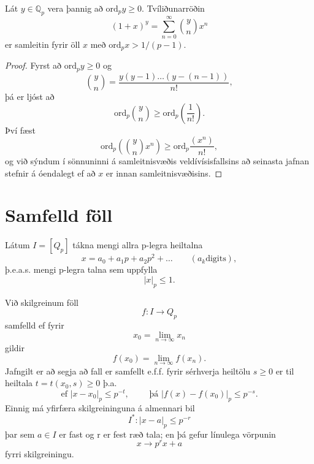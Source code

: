 \begin{setn}
Lát $y\in \mathbb{Q}_p$ vera þannig að $\mbox{ord}_p y \geq 0$. Tvíliðunarröðin 
\begin{equation*}
(1+x)^y = \sum_{n=0}^\infty \binom{y}{n}x^n
\end{equation*}
er samleitin fyrir öll $x$ með $\mbox{ord}_px>1/(p-1)$.
\end{setn}
\begin{proof}
Fyrst að $\mbox{ord}_py\geq0$ og 
\begin{equation*}
\binom{y}{n} = \frac{y(y-1)\ldots (y-(n-1))}{n!},
\end{equation*}
þá er ljóst að
\begin{equation*}
\mbox{ord}_p \binom{y}{n} \geq \mbox{ord}_p \left( \frac{1}{n!} \right).
\end{equation*}
Því fæst
\begin{equation*}
\mbox{ord}_p \left( \binom{y}{n} x^n \right) \geq \mbox{ord}_p \frac{(x^n) }{n!},
\end{equation*}
og við sýndum í sönnuninni á samleitnisvæðis veldívísisfallsins að seinasta jafnan stefnir á óendalegt ef að $x$ er innan samleitnisvæðisins.
\end{proof}


\section*{Samfelld föll}
Látum $I=[Q_p]$ tákna mengi allra p-legra heiltalna
\begin{equation*}
x = a_0 + a_1p+a_2p^2 + \ldots \qquad (a_k \mbox{digits}), 
\end{equation*} 
þ.e.a.s. mengi p-legra talna sem uppfylla
\begin{equation*}
 |x|_p \leq 1 .
\end{equation*}
\begin{skilgr}
Við skilgreinum föll
\begin{equation*}
f:I \rightarrow Q_p
\end{equation*}
samfelld ef fyrir 
\begin{equation*}
x_0 = \lim_{n \rightarrow \infty} x_n
\end{equation*}
gildir
\begin{equation*}
f(x_0) = \lim_{n \rightarrow \infty} f(x_n).
\end{equation*}
Jafngilt er að segja að fall er samfellt e.f.f. fyrir sérhverja heiltölu $s\geq 0$ er til heiltala $t = t(x_0,s)\geq 0$ þ.a.
\begin{equation*}
\mbox{ef } |x-x_0|_p \leq p^{-t},\qquad \mbox{  þá } |f(x)-f(x_0)|_p \leq p^{-s}.
\end{equation*}
Einnig má yfirfæra skilgreininguna á almennari bil
\begin{equation*}
I^* : |x-a|_p \leq p^{-r}
\end{equation*} 
þar sem $a \in I$ er fast og r er fest ræð tala; en þá gefur línulega vörpunin 
\begin{equation*}
x \rightarrow p^rx+a
\end{equation*}
fyrri skilgreiningu.
\end{skilgr}

